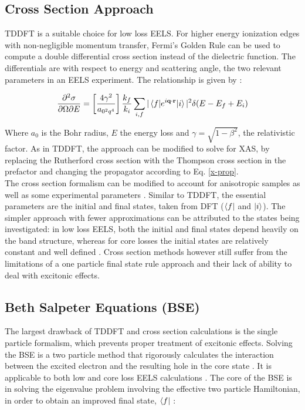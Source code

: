 \subsection{Cross Section Approach}
TDDFT is a suitable choice for low loss EELS.  For higher energy ionization edges with non-negligible momentum transfer, Fermi's Golden Rule can be used to compute a double differential cross section instead of the dielectric function.  The differentials are with respect to energy and scattering angle, the two relevant parameters in an EELS experiment.  The relationship is given by \cite{hebert_practical_2007}:

\begin{equation}
		\frac{\partial^2 \sigma}{\partial \Omega \partial E} = \left[\frac{4\gamma^2}{a_{\mathrm{0}^2q^4}}\right] \frac{k_f}{k_i} \sum_{i,f}|\mel{f}{e^{i\textbf{q}\cdot\textbf{r}}}{i}|^2\delta(E-E_f+E_i)
		\label{telnes_eq}
\end{equation}

Where $a_0$ is the Bohr radius, $E$ the energy loss and $\gamma = \sqrt{1- \beta^2}$, the relativistic factor.  As in TDDFT, the approach can be modified to solve for XAS, by replacing the Rutherford cross section with the Thompson cross section in the prefactor and changing the propagator according to Eq. \ref{x-prop}.\\



The cross section formalism can be modified to account for anisotropic samples as well as some experimental parameters \cite{hebert_practical_2007}. Similar to TDDFT, the essential parameters are the initial and final states, taken from DFT ($\bra{f}$ and $\ket{i}$).  The simpler approach with fewer approximations can be attributed to the states being investigated: in low loss EELS, both the initial and final states depend heavily on the band structure, whereas for core losses the initial states are relatively constant and well defined \cite{hebert_practical_2007}.  Cross section methods however still suffer from the limitations of a one particle final state rule approach and their lack of ability to deal with excitonic effects.  

\subsection{Beth Salpeter Equations (BSE)}

The largest drawback of TDDFT and cross section calculations is the single particle formalism, which prevents proper treatment of excitonic effects. Solving the BSE is a two particle method that rigorously calculates the  interaction between the excited electron and the resulting hole in the core state \cite{salpeter_relativistic_1951}.  It is applicable to both low and core loss EELS calculations \cite{exciting}.  The core of the BSE is in solving the eigenvalue problem involving the effective two particle Hamiltonian, in order to obtain an improved final state, $\bra{f}$ \cite{draxl_bse_2009}: 


